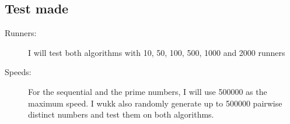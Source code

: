 \subsection{Test made} 

\begin{description}
\item[Runners:] I will test both algorithms with 10, 50, 100, 500, 1000 and 2000
runners 
\item[Speeds:] For the sequential and the prime numbers, I will use
  500000 as the maximum speed. I wukk also randomly generate up to
  500000 pairwise distinct numbers and test them on both algorithms.
\end{description}